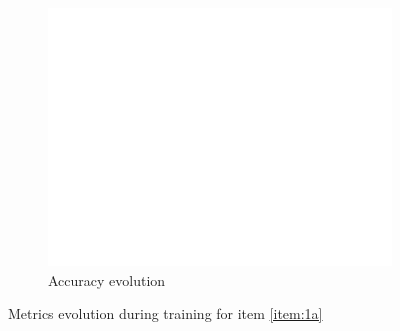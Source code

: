 \documentclass[10pt, a4paper]{article}
\begin{document}
\begin{figure}[htpb]
\begin{subfigure}[b]{0.32\textwidth}
      \centering
      \includegraphics[width=\textwidth]{images/Patch32_imagenet_acc.pdf}
      \caption{Accuracy evolution}
      \label{fig:q1a_acc}
  \end{subfigure}
  \caption{Metrics evolution during training for item \ref{item:1a}}
  \label{fig:q1a_metrics}
\end{figure}
\end{document}
